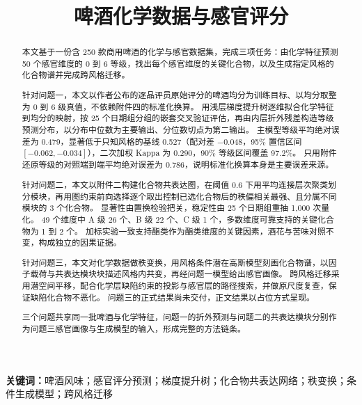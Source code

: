 \documentclass[12pt,a4paper]{article}
\title{\bfseries 啤酒化学数据与感官评分}
\author{}
\date{}
\begin{document}
\maketitle

\begin{abstract}
本文基于一份含 250 款商用啤酒的化学与感官数据集，完成三项任务：由化学特征预测 50 个感官维度的 0 到 6 等级，找出每个感官维度的关键化合物，以及生成指定风格的化合物谱并完成跨风格迁移。

针对问题一，本文以作者公布的逐品评员原始评分的啤酒均分为训练目标、以均分取整为 0 到 6 级真值，不依赖附件四的标准化换算。
用浅层梯度提升树逐维拟合化学特征到均分的映射，按 25 个日期组分组的嵌套交叉验证评估，再由内层折外残差构造等级预测分布，以分布中位数为主要输出、分位数切点为第二输出。
主模型等级平均绝对误差为 0.479，显著低于只知风格的基线 0.527（配对差 $-0.048$，95\% 置信区间 $[-0.062,-0.034]$），二次加权 Kappa 为 0.290，90\% 等级区间覆盖 97.2\%。
只用附件还原等级的对照端到端平均绝对误差为 0.786，说明标准化换算本身是主要误差来源。

针对问题二，本文以附件二构建化合物共表达图，在阈值 0.6 下用平均连接层次聚类划分模块，再用图约束前向选择逐个取出控制已选化合物后的秩偏相关最强、且分属不同模块的 3 个化合物。
显著性由置换检验把关，稳定性由 25 个日期组重抽 1,000 次量化。
49 个维度中 A 级 26 个、B 级 22 个、C 级 1 个，多数维度可靠支持的关键化合物为 1 到 2 个。
加标实验一致支持酯类作为酯类维度的关键因素，酒花与苦味对照不变，构成独立的因果证据。

针对问题三，本文对化学数据做秩变换，用风格条件潜在高斯模型刻画化合物谱，以因子载荷与共表达模块块描述风格内共变，再经问题一模型给出感官画像。
跨风格迁移采用潜空间平移，配合化学层缺陷约束的投影与感官层的路径搜索，并做原尺度复查，保证缺陷化合物不恶化。
问题三的正式结果尚未交付，正文结果以占位方式呈现。

三个问题共享同一批啤酒与化学特征，问题一的折外预测与问题二的共表达模块分别作为问题三感官画像与生成模型的输入，形成完整的方法链条。
\end{abstract}

\noindent\textbf{关键词：}啤酒风味；感官评分预测；梯度提升树；化合物共表达网络；秩变换；条件生成模型；跨风格迁移

\tableofcontents
\newpage











\end{document}
